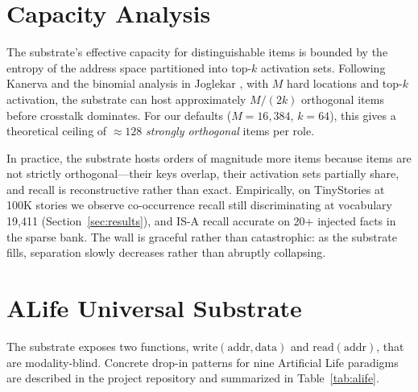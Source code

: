 \documentclass[11pt,a4paper]{article}
\begin{document}
\section{Capacity Analysis}
\label{sec:capacity}

The substrate's effective capacity for distinguishable items is bounded
by the entropy of the address space partitioned into top-$k$ activation
sets.  Following Kanerva \cite{kanerva1988sparse} and the binomial
analysis in Joglekar \cite{joglekar2015capacity}, with $M$ hard
locations and top-$k$ activation, the substrate can host approximately
$M / (2k)$ orthogonal items before crosstalk dominates.  For our
defaults ($M = 16{,}384$, $k = 64$), this gives a theoretical ceiling
of $\approx 128$ \emph{strongly orthogonal} items per role.

In practice, the substrate hosts orders of magnitude more items because
items are not strictly orthogonal---their keys overlap, their activation
sets partially share, and recall is reconstructive rather than exact.
Empirically, on TinyStories at 100K stories we observe co-occurrence
recall still discriminating at vocabulary 19{,}411
(Section~\ref{sec:results}), and IS-A recall accurate on 20+ injected
facts in the sparse bank.  The wall is graceful rather than
catastrophic: as the substrate fills, separation slowly decreases
rather than abruptly collapsing.

\section{ALife Universal Substrate}
\label{sec:alife}

The substrate exposes two functions, $\mathrm{write}(\mathrm{addr},
\mathrm{data})$ and $\mathrm{read}(\mathrm{addr})$, that are
modality-blind.  Concrete drop-in patterns for nine Artificial Life
paradigms are described in the project repository and summarized in
Table~\ref{tab:alife}.
\end{document}
